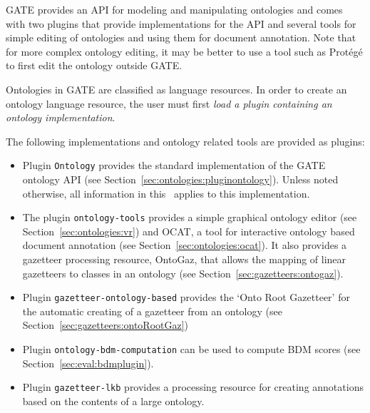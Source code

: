 

GATE provides an API for modeling and manipulating ontologies and 
comes with two plugins that provide implementations for the API  
and several tools for simple editing of ontologies and using them for document annotation.
Note that for more complex ontology editing, it may be better to use a tool such as Prot\'{e}g\'{e} to first edit the ontology outside GATE.



Ontologies in GATE are classified as language resources. In order to create 
an ontology language resource, the user must first  
\emph{load a plugin containing an ontology implementation}.

The following implementations and ontology related tools are provided 
as plugins:
\begin{itemize}
\item Plugin \texttt{Ontology} provides the standard implementation of the GATE
ontology API (see Section~\ref{sec:ontologies:pluginontology}).
Unless noted otherwise, all information in this \chapthing\ applies to this
implementation.
\item The plugin \texttt{ontology-tools} provides a simple graphical ontology 
editor (see Section~\ref{sec:ontologies:vr}) and OCAT, a tool for interactive ontology based
document annotation (see Section~\ref{sec:ontologies:ocat}). It also provides a gazetteer
processing resource, OntoGaz, that allows the mapping of linear 
gazetteers to classes in an ontology (see Section~\ref{sec:gazetteers:ontogaz}).
\item Plugin \texttt{gazetteer-ontology-based} provides the `Onto Root
Gazetteer' for the automatic creating of a gazetteer from an ontology 
(see Section~\ref{sec:gazetteers:ontoRootGaz})
\item Plugin \texttt{ontology-bdm-computation} can be used to compute BDM
scores (see Section~\ref{sec:eval:bdmplugin}).
\item Plugin \texttt{gazetteer-lkb} provides a processing resource for
creating annotations based on the contents of a large ontology.
\end{itemize}

